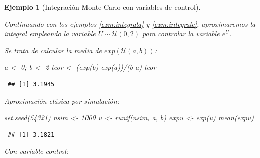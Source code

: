 \documentclass[
  10pt,
]{book}
\newenvironment{Shaded}{\begin{snugshade}}{\end{snugshade}}
\newcommand{\AttributeTok}[1]{\textcolor[rgb]{0.77,0.63,0.00}{#1}}
\newcommand{\CommentTok}[1]{\textcolor[rgb]{0.56,0.35,0.01}{\textit{#1}}}
\newcommand{\DecValTok}[1]{\textcolor[rgb]{0.00,0.00,0.81}{#1}}
\newcommand{\FunctionTok}[1]{\textcolor[rgb]{0.00,0.00,0.00}{#1}}
\newcommand{\NormalTok}[1]{#1}
\newcommand{\OtherTok}[1]{\textcolor[rgb]{0.56,0.35,0.01}{#1}}
\newcommand{\SpecialCharTok}[1]{\textcolor[rgb]{0.00,0.00,0.00}{#1}}
\newcommand{\StringTok}[1]{\textcolor[rgb]{0.31,0.60,0.02}{#1}}
\theoremstyle{break}
\newtheorem{example}{Ejemplo}[chapter]
\theoremstyle{nonumberplain}
\renewcommand{\CommentTok}[1]{\textcolor[rgb]{0.41,0.41,0.41}{\texttt{#1}}}
\begin{document}
\begin{example}[Integración Monte Carlo con variables de control]
\protect\hypertarget{exm:integral-contr}{}\label{exm:integral-contr}

Continuando con los ejemplos \ref{exm:integrala} y \ref{exm:integrale}, aproximaremos la integral empleando la variable \(U\sim\mathcal{U}(0,2)\) para controlar la variable \(e^{U}\).

Se trata de calcular la media de \(exp(\mathcal{U}(a,b))\):

\begin{Shaded}
\begin{Highlighting}[]
\NormalTok{a }\OtherTok{\textless{}{-}} \DecValTok{0}\NormalTok{; b }\OtherTok{\textless{}{-}} \DecValTok{2}
\NormalTok{teor }\OtherTok{\textless{}{-}}\NormalTok{ (}\FunctionTok{exp}\NormalTok{(b)}\SpecialCharTok{{-}}\FunctionTok{exp}\NormalTok{(a))}\SpecialCharTok{/}\NormalTok{(b}\SpecialCharTok{{-}}\NormalTok{a)}
\NormalTok{teor}
\end{Highlighting}
\end{Shaded}

\begin{verbatim}
 ## [1] 3.1945
\end{verbatim}

Aproximación clásica por simulación:

\begin{Shaded}
\begin{Highlighting}[]
\FunctionTok{set.seed}\NormalTok{(}\DecValTok{54321}\NormalTok{)}
\NormalTok{nsim }\OtherTok{\textless{}{-}} \DecValTok{1000}
\NormalTok{u }\OtherTok{\textless{}{-}} \FunctionTok{runif}\NormalTok{(nsim, a, b)}
\NormalTok{expu }\OtherTok{\textless{}{-}} \FunctionTok{exp}\NormalTok{(u)}
\FunctionTok{mean}\NormalTok{(expu) }
\end{Highlighting}
\end{Shaded}

\begin{verbatim}
 ## [1] 3.1821
\end{verbatim}

Con variable control:

\begin{Shaded}
\end{Shaded}


\end{example}
\end{document}
